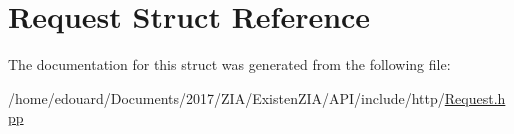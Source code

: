 \hypertarget{structRequest}{}\section{Request Struct Reference}
\label{structRequest}


The documentation for this struct was generated from the following file\+:\begin{DoxyCompactItemize}
\item 
/home/edouard/\+Documents/2017/\+Z\+I\+A/\+Existen\+Z\+I\+A/\+A\+P\+I/include/http/\mbox{\hyperlink{Request_8hpp}{Request.\+hpp}}\end{DoxyCompactItemize}
